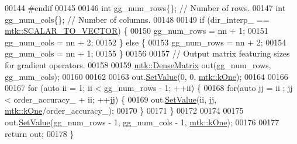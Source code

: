 \begin{DoxyCode}
00144 \textcolor{preprocessor}{  #endif}
00145 
00146   \textcolor{keywordtype}{int} gg\_num\_rows\{\};  \textcolor{comment}{// Number of rows.}
00147   \textcolor{keywordtype}{int} gg\_num\_cols\{\};  \textcolor{comment}{// Number of columns.}
00148 
00149   \textcolor{keywordflow}{if} (dir\_interp\_ == \hyperlink{namespacemtk_ga674ec67bd1baa04e5dc06c2bcc351972abc9e2b8cd5a497c9f3252a792e356139}{mtk::SCALAR\_TO\_VECTOR}) \{
00150     gg\_num\_rows = nn + 1;
00151     gg\_num\_cols = nn + 2;
00152   \} \textcolor{keywordflow}{else} \{
00153     gg\_num\_rows = nn + 2;
00154     gg\_num\_cols = nn + 1;
00155   \}
00156 
00157   \textcolor{comment}{// Output matrix featuring sizes for gradient operators.}
00158 
00159   \hyperlink{classmtk_1_1DenseMatrix}{mtk::DenseMatrix} out(gg\_num\_rows, gg\_num\_cols);
00160 
00162 
00163   out.\hyperlink{classmtk_1_1DenseMatrix_a784ce5784109ac86bfb9d8562b334b13}{SetValue}(0, 0, \hyperlink{group__c01-roots_ga26407c24d43b6b95480943340d285c71}{mtk::kOne});
00164 
00166 
00167   \textcolor{keywordflow}{for} (\textcolor{keyword}{auto} ii = 1; ii < gg\_num\_rows - 1; ++ii) \{
00168     \textcolor{keywordflow}{for}(\textcolor{keyword}{auto} jj = ii ; jj < order\_accuracy\_ + ii; ++jj) \{
00169       out.\hyperlink{classmtk_1_1DenseMatrix_a784ce5784109ac86bfb9d8562b334b13}{SetValue}(ii, jj, \hyperlink{group__c01-roots_ga26407c24d43b6b95480943340d285c71}{mtk::kOne}/order\_accuracy\_);
00170     \}
00171   \}
00172 
00174 
00175   out.\hyperlink{classmtk_1_1DenseMatrix_a784ce5784109ac86bfb9d8562b334b13}{SetValue}(gg\_num\_rows - 1, gg\_num\_cols - 1, \hyperlink{group__c01-roots_ga26407c24d43b6b95480943340d285c71}{mtk::kOne});
00176 
00177   \textcolor{keywordflow}{return} out;
00178 \}
\end{DoxyCode}
